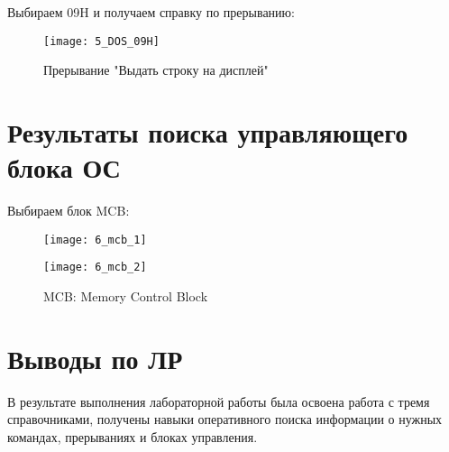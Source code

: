 Выбираем 09H и получаем справку по прерыванию:
\begin{figure}[H]
  \begin{center}
    \texttt{[image: 5\_DOS\_09H]}
    \caption{Прерывание "Выдать строку на дисплей"}
    \label{pic:pic_name}
  \end{center}
\end{figure}

\section{Результаты поиска управляющего блока ОС}

Выбираем блок MCB:
\begin{figure}[H]
  \begin{center}
    \texttt{[image: 6\_mcb\_1]}
  \end{center}
  \begin{center}
    \texttt{[image: 6\_mcb\_2]}
    \caption{MCB: Memory Control Block}
    \label{pic:pic_name}
  \end{center}
\end{figure}

\section{Выводы по ЛР}
В результате выполнения лабораторной работы была освоена работа с тремя справочниками,
получены навыки оперативного поиска информации о нужных командах, прерываниях и блоках
управления.